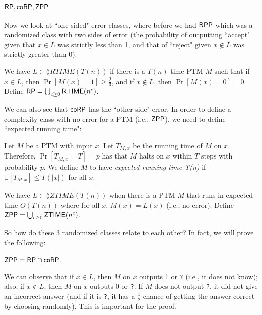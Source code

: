 \subsection{${\mathsf{RP}}, {\mathsf{coRP}}, {\mathsf{ZPP}}$}
Now we look at ``one-sided" error classes, where before we had ${\mathsf{BPP}}$ which was a randomized class with two sides of error (the probability of outputting ``accept" given that $x \in L$ was strictly less than 1, and that of ``reject" given $x \notin L$ was strictly greater than 0). 

\newcommand{\RTIME}{\lang{RTIME}}
\newcommand{\ZTIME}{\lang{ZTIME}}
\begin{definition}
We have $L \in \RTIME(T(n))$ if there is a $T(n)$-time PTM $M$ such that if $x \in L$, then $\Pr[M(x) = 1] \ge \frac{2}{3}$, and if $x \notin L$, then $\Pr[M(x) = 0] = 0$. Define $\RP = \bigcup_{c \ge 0}\RTIME(n^c)$. 
\end{definition}

We can also see that ${\mathsf{coRP}}$ has the ``other side" error. In order to define a complexity class with no error for a PTM (i.e., ${\mathsf{ZPP}}$), we need to define ``expected running time":

\begin{definition}
Let $M$ be a PTM with input $x$. Let $T_{M,x}$ be the running time of $M$ on $x$. Therefore, $\Pr[T_{M, x} = T] = p$ has that $M$ halts on $x$ within $T$ steps with probability $p$. We define $M$ to have \emph{expected running time T(n)} if $\mathbb{E}[T_{M, x}] \le T(|x|)$ for all $x$. 
\end{definition}

\begin{definition}
We have $L \in \ZTIME(T(n))$ when there is a PTM $M$ that runs in expected time $O(T(n))$ where for all $x$, $M(x) = L(x)$ (i.e., no error). Define $\ZPP = \bigcup_{c \ge 0}\ZTIME(n^c)$. 
\end{definition}

So how do these 3 randomized classes relate to each other? In fact, we will prove the following:
\begin{theorem}
${\mathsf{ZPP}} = {\mathsf{RP}} \cap {\ensuremath{\mathsf{coRP}}}$. 
\end{theorem}

We can observe that if $x \in L$, then $M$ on $x$ outputs 1 or \texttt{?} (i.e., it does not know); also, if $x \notin L$, then $M$ on $x$ outputs 0 or \texttt{?}. If $M$ does not output \texttt{?}, it did not give an incorrect answer (and if it is \texttt{?}, it has a $\frac{1}{2}$ chance of getting the answer correct by choosing randomly). This is important for the proof. 

